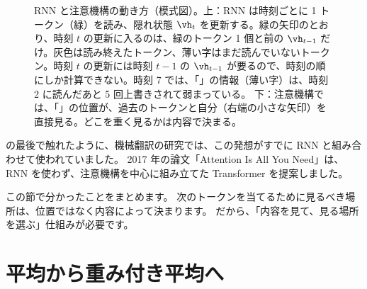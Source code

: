 \begin{figure}[tbp]
\caption{RNN と注意機構の動き方（模式図）。上：RNN は時刻ごとに 1 トークン（緑）を読み、隠れ状態 $\vh_t$ を更新する。緑の矢印のとおり、時刻 $t$ の更新に入るのは、緑のトークン 1 個と前の $\vh_{t-1}$ だけ。灰色は読み終えたトークン、薄い字はまだ読んでいないトークン。時刻 $t$ の更新には時刻 $t-1$ の $\vh_{t-1}$ が要るので、時刻の順にしか計算できない。時刻 7 では、「」の情報（薄い字）は、時刻 2 に読んだあと 5 回上書きされて弱まっている。
下：注意機構では、「\code{=}」の位置が、過去のトークンと自分（右端の小さな矢印）を直接見る。どこを重く見るかは内容で決まる。}
\label{fig:attn-rnn-frames}
\end{figure}

の最後で触れたように、機械翻訳の研究では、この発想がすでに RNN と組み合わせて使われていました\cite{bahdanau2015neural}。
2017 年の論文「Attention Is All You Need」\cite{vaswani2017attention}は、RNN を使わず、注意機構を中心に組み立てた Transformer を提案しました。

この節で分かったことをまとめます。
次のトークンを当てるために見るべき場所は、位置ではなく内容によって決まります。
だから、「内容を見て、見る場所を選ぶ」仕組みが必要です。

\section{平均から重み付き平均へ}\label{sec:attn-average}

